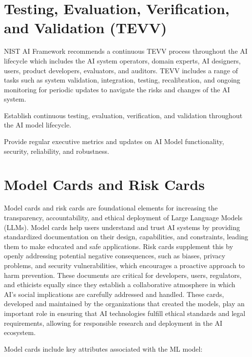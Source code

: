 \section{Testing, Evaluation, Verification, and Validation (TEVV)}
NIST AI Framework recommends a continuous TEVV process throughout the AI lifecycle which includes the AI system operators, domain experts, AI designers, users, product developers, evaluators, and auditors. TEVV includes a range of tasks such as system validation, integration, testing, recalibration, and ongoing monitoring for periodic updates to navigate the risks and changes of the AI system.

\begin{minipage}{\linewidth}
\begin{checklist}
  \item Establish continuous testing, evaluation, verification, and validation throughout the AI model lifecycle.
  \item Provide regular executive metrics and updates on AI Model functionality, security, reliability, and robustness.
\end{checklist}
\end{minipage}

\clearpage

\section{Model Cards and Risk Cards}
Model cards and risk cards are foundational elements for increasing the transparency, accountability, and ethical deployment of Large Language Models (LLMs). Model cards help users understand and trust AI systems by providing standardized documentation on their design, capabilities, and constraints, leading them to make educated and safe applications. Risk cards supplement this by openly addressing potential negative consequences, such as biases, privacy problems, and security vulnerabilities, which encourages a proactive approach to harm prevention. These documents are critical for developers, users, regulators, and ethicists equally since they establish a collaborative atmosphere in which AI's social implications are carefully addressed and handled. These cards, developed and maintained by the organizations that created the models, play an important role in ensuring that AI technologies fulfill ethical standards and legal requirements, allowing for responsible research and deployment in the AI ecosystem.

Model cards include key attributes associated with the ML model:

